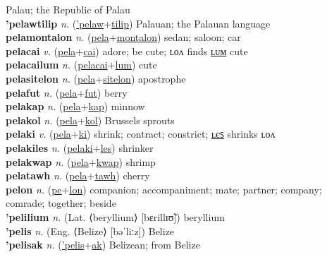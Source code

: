 Palau; the Republic of Palau \label{'pelawtec} \\
\textbf{'pelawtilip} \textit{n.} (\hyperref['pelaw]{'pelaw}+\hyperref[tilip]{tilip})
Palauan; the Palauan language \label{'pelawtilip} \\
\textbf{pelamontalon} \textit{n.} (\hyperref[pela]{pela}+\hyperref[montalon]{montalon})
sedan; saloon; car \label{pelamontalon} \\
\textbf{pelacai} \textit{v.} (\hyperref[pela]{pela}+\hyperref[cai]{cai})
adore; be cute; ʟᴏᴧ finds \hyperref[pelacailum]{ʟᴜᴍ} cute \label{pelacai} \\
\textbf{pelacailum} \textit{n.} (\hyperref[pelacai]{pelacai}+\hyperref[lum]{lum})
cute \label{pelacailum} \\
\textbf{pelasitelon} \textit{n.} (\hyperref[pela]{pela}+\hyperref[sitelon]{sitelon})
apostrophe \label{pelasitelon} \\
\textbf{pelafut} \textit{n.} (\hyperref[pela]{pela}+\hyperref[fut]{fut})
berry \label{pelafut} \\
\textbf{pelakap} \textit{n.} (\hyperref[pela]{pela}+\hyperref[kap]{kap})
minnow \label{pelakap} \\
\textbf{pelakol} \textit{n.} (\hyperref[pela]{pela}+\hyperref[kol]{kol})
Brussels sprouts \label{pelakol} \\
\textbf{pelaki} \textit{v.} (\hyperref[pela]{pela}+\hyperref[ki]{ki})
shrink; contract; constrict; \hyperref[pelakiles]{ʟєꜱ} shrinks ʟᴏᴧ \label{pelaki} \\
\textbf{pelakiles} \textit{n.} (\hyperref[pelaki]{pelaki}+\hyperref[les]{les})
shrinker \label{pelakiles} \\
\textbf{pelakwap} \textit{n.} (\hyperref[pela]{pela}+\hyperref[kwap]{kwap})
shrimp \label{pelakwap} \\
\textbf{pelatawh} \textit{n.} (\hyperref[pela]{pela}+\hyperref[tawh]{tawh})
cherry \label{pelatawh} \\
\textbf{pelon} \textit{n.} (\hyperref[pe]{pe}+\hyperref[lon]{lon})
companion; accompaniment; mate; partner; company; comrade; together; beside \label{pelon} \\
\textbf{'pelilium} \textit{n.} (Lat. ⟨beryllium⟩ [bɛrillɪʊ̃])
beryllium \label{'pelilium} \\
\textbf{'pelis} \textit{n.} (Eng. ⟨Belize⟩ [bəˈliːz])
Belize \label{'pelis} \\
\textbf{'pelisak} \textit{n.} (\hyperref['pelis]{'pelis}+\hyperref[ak]{ak})
Belizean; from Belize \label{'pelisak} \\
